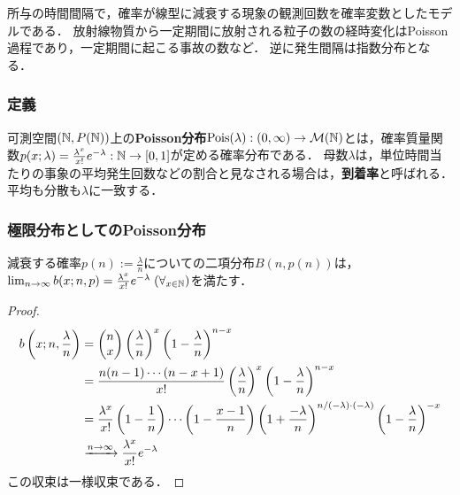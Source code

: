 \documentclass[uplatex,dvipdfmx]{jsreport}
\begin{document}
\begin{tcolorbox}[colframe=ForestGreen, colback=ForestGreen!10!white,breakable,colbacktitle=ForestGreen!40!white,coltitle=black,fonttitle=\bfseries\sffamily,
title=極限分布のお手本]
    所与の時間間隔で，確率が線型に減衰する現象の観測回数を確率変数としたモデルである．
    放射線物質から一定期間に放射される粒子の数の経時変化はPoisson過程であり，一定期間に起こる事故の数など．
    逆に発生間隔は指数分布となる．
\end{tcolorbox}

\subsubsection{定義}

\begin{definition}
    可測空間$(\mathbb{N},P(\mathbb{N}))$上の\textbf{Poisson分布}$\mathrm{Pois}(\lambda):(0,\infty)\to\mathcal{M}(\mathbb{N})$とは，確率質量関数$p(x;\lambda)=\frac{\lambda^x}{x!}e^{-\lambda}:\mathbb{N}\to[0,1]$が定める確率分布である．
    母数$\lambda$は，単位時間当たりの事象の平均発生回数などの割合と見なされる場合は，\textbf{到着率}と呼ばれる．
    平均も分散も$\lambda$に一致する．
\end{definition}



\subsubsection{極限分布としてのPoisson分布}\begin{proposition}
    減衰する確率$p(n):=\frac{\lambda}{n}$についての二項分布$B(n,p(n))$は，$\lim_{n\to\infty}b(x;n,p)=\frac{\lambda^x}{x!}e^{-\lambda}\;(\forall_{x\in\mathbb{N}})$を満たす．
\end{proposition}
\begin{proof}
    \begin{align*}
        b\left(x;n,\frac{\lambda}{n}\right)&=\begin{pmatrix}n\\x\end{pmatrix}\left(\frac{\lambda}{n}\right)^x\left(1-\frac{\lambda}{n}\right)^{n-x}\\
        &=\frac{n(n-1)\cdots (n-x+1)}{x!}\left(\frac{\lambda}{n}\right)^x\left(1-\frac{\lambda}{n}\right)^{n-x}\\
        &=\frac{\lambda^x}{x!}\left(1-\frac{1}{n}\right)\cdots\left(1-\frac{x-1}{n}\right)\left(1+\frac{-\lambda}{n}\right)^{n/(-\lambda)\cdot(-\lambda)}\left(1-\frac{\lambda}{n}\right)^{-x}\\
        &\xrightarrow{n\to\infty}\frac{\lambda^x}{x!}e^{-\lambda}
    \end{align*}
    この収束は一様収束である．
\end{proof}
\end{document}
